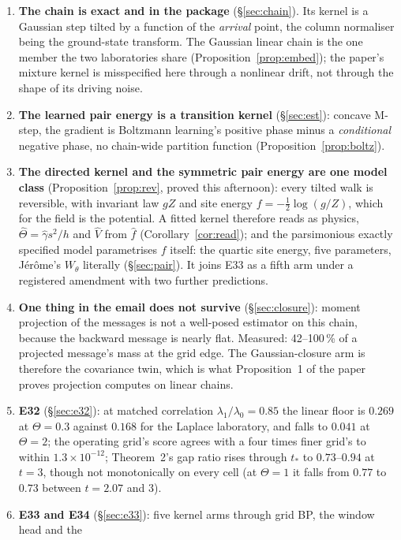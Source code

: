 \documentclass[10pt,a4paper]{article}
\newcommand{\Th}{\Theta}
\newcommand{\st}[1]{\textbf{#1}}
\theoremstyle{plain}
\theoremstyle{remark}
\begin{document}
\begin{enumerate}[leftmargin=1.4em,itemsep=0.15em]
\item \st{The chain is exact and in the package} (\S\ref{sec:chain}). Its kernel is a Gaussian step
  tilted by a function of the \emph{arrival} point, the column normaliser being the ground-state
  transform. The Gaussian linear chain is the one member the two laboratories share
  (Proposition~\ref{prop:embed}); the paper's mixture kernel is misspecified here through a nonlinear
  drift, not through the shape of its driving noise.
\item \st{The learned pair energy is a transition kernel} (\S\ref{sec:est}): concave M-step, the
  gradient is Boltzmann learning's positive phase minus a \emph{conditional} negative phase, no
  chain-wide partition function (Proposition~\ref{prop:boltz}).
\item \st{The directed kernel and the symmetric pair energy are one model class}
  (Proposition~\ref{prop:rev}, proved this afternoon): every tilted walk is reversible, with invariant
  law $gZ$ and site energy $f=-\tfrac12\log(g/Z)$, which for the field is the potential. A fitted
  kernel therefore reads as physics, $\hat\Th=\hat\gamma s^2/h$ and $\hat V$ from $\hat f$
  (Corollary~\ref{cor:read}); and the parsimonious exactly specified model parametrises $f$ itself: the
  quartic site energy, five parameters, Jérôme's $W_\theta$ literally (\S\ref{sec:pair}). It joins E33
  as a fifth arm under a registered amendment with two further predictions.
\item \st{One thing in the email does not survive} (\S\ref{sec:closure}): moment projection of the
  messages is not a well-posed estimator on this chain, because the backward message is nearly flat.
  Measured: 42--100\,\% of a projected message's mass at the grid edge. The Gaussian-closure arm is
  therefore the covariance twin, which is what Proposition~1 of the paper proves projection
  computes on linear chains.
\item \st{E32} (\S\ref{sec:e32}): at matched correlation $\lambda_1/\lambda_0=0.85$ the linear floor
  is $0.269$ at $\Th=0.3$ against $0.168$ for the Laplace laboratory, and falls to $0.041$ at
  $\Th=2$; the operating grid's score agrees with a four times finer grid's to within $1.3\times10^{-12}$; Theorem~2's gap ratio rises
  through $t_*$ to $0.73$--$0.94$ at $t=3$, though not monotonically on every cell (at $\Th=1$ it falls from $0.77$ to $0.73$
  between $t=2.07$ and $3$).
\item \st{E33 and E34} (\S\ref{sec:e33}): five kernel arms through grid BP, the window head and the

\end{enumerate}
\end{document}

